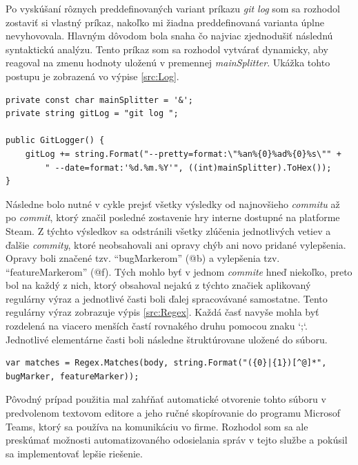 \documentclass[slovak, bachelorpractice]{diploma}
\begin{document}
Po vyskúšaní rôznych preddefinovaných variant príkazu \textit{git log} som sa rozhodol zostaviť si vlastný príkaz, nakoľko mi žiadna preddefinovaná varianta úplne nevyhovovala. Hlavným dôvodom bola snaha čo najviac zjednodušiť následnú syntaktickú analýzu. Tento príkaz som sa rozhodol vytvárať dynamicky, aby reagoval na zmenu hodnoty uloženú v premennej \textit{mainSplitter}. Ukážka tohto postupu je zobrazená vo výpise \ref{src:Log}.
\vspace{10pt}
\begin{lstlisting}[label=src:Log,caption={Dynamické vytváranie vlastného príkazu \textit{git log}}]
private const char mainSplitter = '&';
private string gitLog = "git log ";

public GitLogger() {
    gitLog += string.Format("--pretty=format:\"%an%{0}%ad%{0}%s\"" +
        " --date=format:'%d.%m.%Y'", ((int)mainSplitter).ToHex());
}
\end{lstlisting}

Následne bolo nutné v cykle prejsť všetky výsledky od najnovšieho \textit{commitu} až po \textit{commit}, ktorý značil posledné zostavenie hry interne dostupné na platforme Steam. Z týchto výsledkov sa odstránili všetky zlúčenia jednotlivých vetiev a ďalšie  \textit{commity}, ktoré neobsahovali ani opravy chýb ani novo pridané vylepšenia. Opravy boli značené tzv. \enquote{bugMarkerom} (@b) a vylepšenia tzv. \enquote{featureMarkerom} (@f). Tých mohlo byť v jednom \textit{commite} hneď niekoľko, preto bol na každý z nich, ktorý obsahoval nejakú z týchto značiek aplikovaný regulárny výraz a jednotlivé časti boli ďalej spracovávané samostatne. Tento regulárny výraz zobrazuje výpis \ref{src:Regex}. Každá časť navyše mohla byť rozdelená na viacero menších častí rovnakého druhu pomocou znaku `;`. Jednotlivé elementárne časti boli následne štruktúrovane uložené do súboru.
\vspace{10pt}
\begin{lstlisting}[label=src:Regex,caption={Regulárny výraz určený na syntaktickú analýzu tela \textit{commitu}}]
var matches = Regex.Matches(body, string.Format("({0}|{1})[^@]*", bugMarker, featureMarker));
\end{lstlisting}

Pôvodný prípad použitia mal zahŕňať automatické otvorenie tohto súboru v predvolenom textovom editore a jeho ručné skopírovanie do programu Microsof Teams, ktorý sa používa na komunikáciu vo firme. Rozhodol som sa ale preskúmať možnosti automatizovaného odosielania správ v tejto službe a pokúsil sa implementovať lepšie riešenie.
\end{document}
